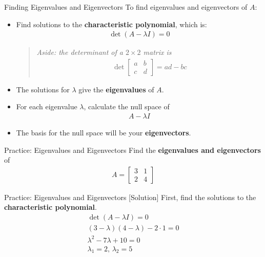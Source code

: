 \begin{frame}{Finding Eigenvalues and Eigenvectors}
    To find eigenvalues and eigenvectors of $A$:
    \begin{itemize}
        \item Find solutions to the \textbf{characteristic polynomial}, which is:
        \begin{align*}
            \det(A - \lambda I) = 0
        \end{align*}
        \begin{quotation}
            \textit{Aside: the determinant of a $2 \times 2$ matrix is}
            \begin{align*}
                \det \begin{bmatrix}
                    a & b \\ c & d
                \end{bmatrix} = 
                ad - bc
            \end{align*}
        \end{quotation}
        \item The solutions for $\lambda$ give the \textbf{eigenvalues} of $A$.
        \item For each eigenvalue $\lambda$, calculate the null space of
        \begin{align*}
            A - \lambda I
        \end{align*}
        \item The basis for the null space will be your \textbf{eigenvectors}.
    \end{itemize}
\end{frame}

\begin{frame}{Practice: Eigenvalues and Eigenvectors}
    Find the \textbf{eigenvalues and eigenvectors} of
    \begin{align*}
        A = \begin{bmatrix}
            3 & 1 \\ 2 & 4
        \end{bmatrix}
    \end{align*}
\end{frame}

\begin{frame}{Practice: Eigenvalues and Eigenvectors [Solution]}
    First, find the solutions to the \textbf{characteristic polynomial}.
    \begin{align*}
        \det(A - \lambda I) = 0 \\
        (3 - \lambda)(4 - \lambda) - 2 \cdot 1 = 0 \\
        \lambda^2 - 7\lambda + 10 = 0 \\
        \lambda_1 = 2, \, \lambda_2 = 5
    \end{align*}
\end{frame}

